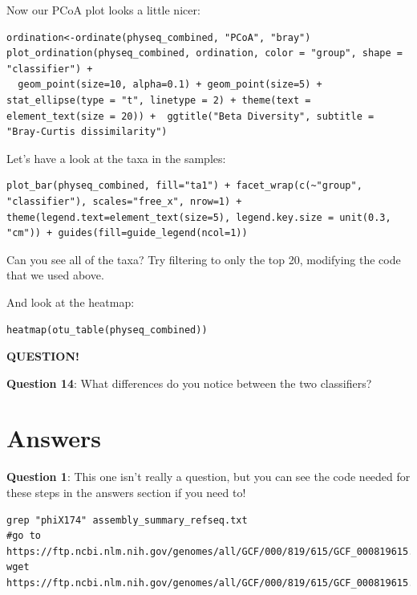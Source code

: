 \documentclass[
]{book}
\newenvironment{bluebox}{
  \definecolor{shadecolor}{RGB}{172, 210, 237}
  \color{white}
  \begin{shaded}}
 {\end{shaded}}
\begin{document}
Now our PCoA plot looks a little nicer:

\begin{verbatim}
ordination<-ordinate(physeq_combined, "PCoA", "bray")
plot_ordination(physeq_combined, ordination, color = "group", shape = "classifier") +
  geom_point(size=10, alpha=0.1) + geom_point(size=5) + stat_ellipse(type = "t", linetype = 2) + theme(text = element_text(size = 20)) +  ggtitle("Beta Diversity", subtitle = "Bray-Curtis dissimilarity")
\end{verbatim}

Let's have a look at the taxa in the samples:

\begin{verbatim}
plot_bar(physeq_combined, fill="ta1") + facet_wrap(c(~"group", "classifier"), scales="free_x", nrow=1) + theme(legend.text=element_text(size=5), legend.key.size = unit(0.3, "cm")) + guides(fill=guide_legend(ncol=1))
\end{verbatim}

Can you see all of the taxa? Try filtering to only the top 20, modifying the code that we used above.

And look at the heatmap:

\begin{verbatim}
heatmap(otu_table(physeq_combined))
\end{verbatim}

\begin{bluebox}

\begin{center}
\textbf{QUESTION!}

\end{center}

\textbf{Question 14}: What differences do you notice between the two classifiers?

\end{bluebox}

\section{Answers}\label{answers}

\textbf{Question 1}: This one isn't really a question, but you can see the code needed for these steps in the answers section if you need to!

\begin{verbatim}
grep "phiX174" assembly_summary_refseq.txt 
#go to https://ftp.ncbi.nlm.nih.gov/genomes/all/GCF/000/819/615/GCF_000819615.1_ViralProj14015/
wget https://ftp.ncbi.nlm.nih.gov/genomes/all/GCF/000/819/615/GCF_000819615.1_ViralProj14015/GCF_000819615.1_ViralProj14015_genomic.fna.gz
\end{verbatim}
\end{document}
